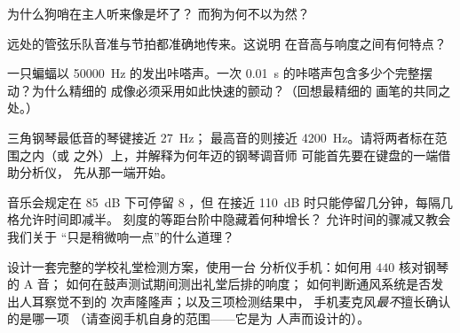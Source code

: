 \begin{exercise}[$\star$]\label{exo:g8:sound-pitch-loudness:7}
为什么狗哨在主人听来像是坏了？
而狗为何不以为然？
\end{exercise}

\begin{exercise}[$\star$]\label{exo:g8:sound-pitch-loudness:8}
远处的管弦乐队音准与节拍都准确地传来。这说明
在音高与响度之间有何特点？
\end{exercise}

\begin{exercise}[$\star\star$]\label{exo:g8:sound-pitch-loudness:9}
一只蝙蝠以 \qty{50000}{Hz} 的发出咔嗒声。一次
\qty{0.01}{s} 的咔嗒声包含多少个完整摆动？为什么精细的
成像必须采用如此快速的颤动？（回想最精细的
画笔的共同之处。）
\end{exercise}

\begin{exercise}[$\star\star$]\label{exo:g8:sound-pitch-loudness:10}
三角钢琴最低音的琴键接近 \qty{27}{Hz}；
最高音的则接近 \qty{4200}{Hz}。请将两者标在范围之内（或
之外）上，并解释为何年迈的钢琴调音师
可能首先要在键盘的一端借助分析仪，
先从那一端开始。
\end{exercise}

\begin{exercise}[$\star\star$]\label{exo:g8:sound-pitch-loudness:11}
音乐会规定在 \qty{85}{dB} 下可停留 $8$ ，但
在接近 \qty{110}{dB} 时只能停留几分钟，每隔几格允许时间即减半。
刻度的等距台阶中隐藏着何种增长？
允许时间的骤减又教会我们关于
“只是稍微响一点”的什么道理？
\end{exercise}

\begin{exercise}[$\star\star\star$]\label{exo:g8:sound-pitch-loudness:12}
设计一套完整的学校礼堂检测方案，使用一台
分析仪手机：如何用 $440$ 核对钢琴的 A 音；
如何在鼓声测试期间测出礼堂后排的响度；
如何判断通风系统是否发出人耳察觉不到的
次声隆隆声；以及三项检测结果中，
手机麦克风\emph{最不}擅长确认的是哪一项
（请查阅手机自身的范围——它是为
人声而设计的）。
\end{exercise}

